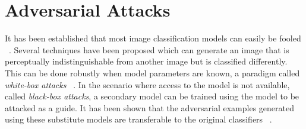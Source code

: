 





\section{Adversarial Attacks\label{sec:advattacks}}
It has been established that most image classification models can easily be fooled ~\cite{Szegedy2013IntriguingPO,Goodfellow2014ExplainingAH}. 
Several techniques have been proposed which can generate an image that is perceptually indistinguishable from another image but is classified differently. 
This can be done robustly when model parameters are known, a paradigm called \textit{white-box attacks} ~\cite{Goodfellow2014ExplainingAH,Kurakin2016AdversarialEI,Madry2017TowardsDL,Carlini2017TowardsET}.
In the scenario where access to the model is not available, called \textit{black-box attacks}, a secondary model can be trained using the model to be attacked as a guide.
It has been shown that the adversarial examples generated using these substitute models are transferable to the original classifiers ~\cite{Papernot2016PracticalBA,Liu2016DelvingIT}.

